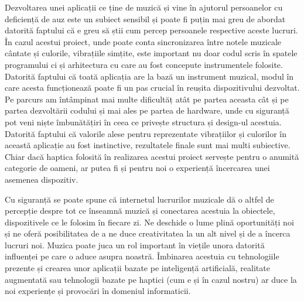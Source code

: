 Dezvoltarea unei aplicații ce ține de muzică și vine în ajutorul persoanelor cu deficiență de auz este un subiect sensibil și poate fi puțin mai greu de abordat datorită faptului că e greu să știi cum percep persoanele respective aceste lucruri. În cazul acestui proiect, unde poate conta  sincronizarea între notele muzicale cântate și culorile, vibrațiile simțite, este important nu doar codul scris în spatele programului ci și arhitectura cu care au fost concepute instrumentele folosite. Datorită faptului că toată aplicația are la bază un instrument muzical, modul în care acesta funcționează poate fi un pas crucial în reușita dispozitivului dezvoltat. Pe parcurs am întâmpinat mai multe dificultăț atât pe partea aceasta cât și pe partea dezvoltării codului și mai ales pe partea de hardware, unde cu siguranță pot veni niște îmbunătățiri în ceea ce privește structura și design-ul acestuia. Datorită faptului că va\-lo\-ri\-le alese pentru reprezentate vibrațiilor și culorilor în această aplicație au fost instinctive, rezultatele finale sunt mai multi subiective. Chiar dacă haptica folosită în realizarea acestui proiect servește pentru o anumită categorie de oameni, ar putea fi și pentru noi o experiență încercarea unei asemenea dispozitiv.
\\
\par Cu siguranță se poate spune că internetul lucrurilor muzicale dă o altfel de percepție despre tot ce înseamnă muzică și conectarea acestuia la obiectele, dispozitivele ce le folosim în fiecare zi. Ne deschide o lume plină oportunități noi și ne oferă posibilitatea de a ne duce creativitatea la un alt nivel și de a încerca lucruri noi. Muzica poate juca un rol important în viețile unora datorită influenței pe care o aduce asupra noastră. Îmbinarea acestuia cu tehnologiile prezente și crearea unor aplicații bazate pe inteligență artificială, realitate augmentată sau tehnologii bazate pe haptici (cum e și în cazul nostru) ar duce la noi experiențe și provocări în domeniul informaticii.
